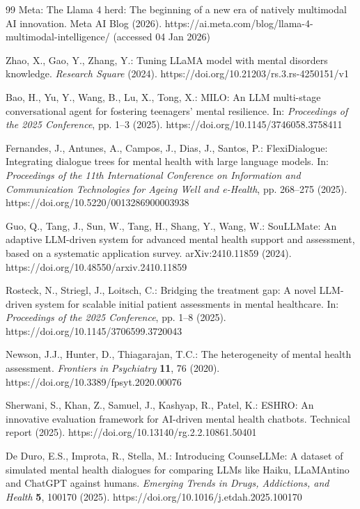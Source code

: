 \documentclass[sigconf]{acmart}
\begin{document}
\begin{thebibliography}{99}
 Meta: The Llama 4 herd: The beginning of a new era of natively multimodal AI innovation. Meta AI Blog (2026). https://ai.meta.com/blog/llama-4-multimodal-intelligence/ (accessed 04 Jan 2026)

 Zhao, X., Gao, Y., Zhang, Y.: Tuning LLaMA model with mental disorders knowledge. \textit{Research Square} (2024). https://doi.org/10.21203/rs.3.rs-4250151/v1

 Bao, H., Yu, Y., Wang, B., Lu, X., Tong, X.: MILO: An LLM multi-stage conversational agent for fostering teenagers' mental resilience. In: \textit{Proceedings of the 2025 Conference}, pp. 1--3 (2025). https://doi.org/10.1145/3746058.3758411

 Fernandes, J., Antunes, A., Campos, J., Dias, J., Santos, P.: FlexiDialogue: Integrating dialogue trees for mental health with large language models. In: \textit{Proceedings of the 11th International Conference on Information and Communication Technologies for Ageing Well and e-Health}, pp. 268--275 (2025). https://doi.org/10.5220/0013286900003938

 Guo, Q., Tang, J., Sun, W., Tang, H., Shang, Y., Wang, W.: SouLLMate: An adaptive LLM-driven system for advanced mental health support and assessment, based on a systematic application survey. arXiv:2410.11859 (2024). https://doi.org/10.48550/arxiv.2410.11859

 Rosteck, N., Striegl, J., Loitsch, C.: Bridging the treatment gap: A novel LLM-driven system for scalable initial patient assessments in mental healthcare. In: \textit{Proceedings of the 2025 Conference}, pp. 1--8 (2025). https://doi.org/10.1145/3706599.3720043

 Newson, J.J., Hunter, D., Thiagarajan, T.C.: The heterogeneity of mental health assessment. \textit{Frontiers in Psychiatry} \textbf{11}, 76 (2020). https://doi.org/10.3389/fpsyt.2020.00076

 Sherwani, S., Khan, Z., Samuel, J., Kashyap, R., Patel, K.: ESHRO: An innovative evaluation framework for AI-driven mental health chatbots. Technical report (2025). https://doi.org/10.13140/rg.2.2.10861.50401

 De Duro, E.S., Improta, R., Stella, M.: Introducing CounseLLMe: A dataset of simulated mental health dialogues for comparing LLMs like Haiku, LLaMAntino and ChatGPT against humans. \textit{Emerging Trends in Drugs, Addictions, and Health} \textbf{5}, 100170 (2025). https://doi.org/10.1016/j.etdah.2025.100170


\end{thebibliography}
\end{document}
